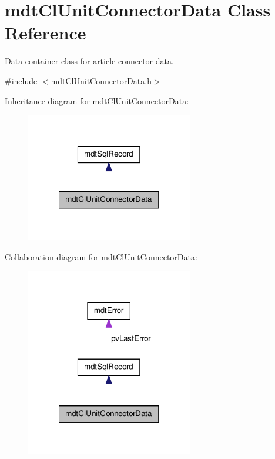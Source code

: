 \hypertarget{classmdt_cl_unit_connector_data}{\section{mdt\-Cl\-Unit\-Connector\-Data Class Reference}
\label{classmdt_cl_unit_connector_data}
}


Data container class for article connector data.  




{\ttfamily \#include $<$mdt\-Cl\-Unit\-Connector\-Data.\-h$>$}



Inheritance diagram for mdt\-Cl\-Unit\-Connector\-Data\-:\nopagebreak
\begin{figure}[H]
\begin{center}
\leavevmode
\includegraphics[width=206pt]{classmdt_cl_unit_connector_data__inherit__graph}
\end{center}
\end{figure}


Collaboration diagram for mdt\-Cl\-Unit\-Connector\-Data\-:\nopagebreak
\begin{figure}[H]
\begin{center}
\leavevmode
\includegraphics[width=206pt]{classmdt_cl_unit_connector_data__coll__graph}
\end{center}
\end{figure}
